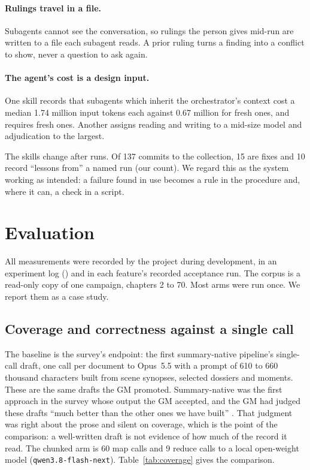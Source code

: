 \documentclass[11pt]{article}
\newcommand{\code}[1]{\texttt{#1}}
\begin{document}
\paragraph{Rulings travel in a file.} Subagents cannot see the conversation, so rulings
the person gives mid-run are written to a file each subagent reads. A prior ruling turns
a finding into a conflict to show, never a question to ask again.

\paragraph{The agent's cost is a design input.} One skill records that subagents which
inherit the orchestrator's context cost a median 1.74 million input tokens each against
0.67 million for fresh ones, and requires fresh ones. Another assigns reading and
writing to a mid-size model and adjudication to the largest.

The skills change after runs. Of 137 commits to the collection, 15 are fixes and 10
record ``lessons from'' a named run (our count). We regard this as the system working as
intended: a failure found in use becomes a rule in the procedure and, where it can, a
check in a script.

\section{Evaluation}
\label{sec:eval}

All measurements were recorded by the project during development, in an experiment log
() and in each feature's
recorded acceptance run. The corpus is a read-only copy of one campaign, chapters 2 to
70. Most arms were run once. We report them as a case study.

\subsection{Coverage and correctness against a single call}

The baseline is the survey's endpoint: the first summary-native pipeline's single-call
draft, one call per document to Opus~5.5 with a prompt of 610 to 660 thousand
characters built from scene synopses, selected dossiers and moments.
These are the same drafts the GM promoted. Summary-native was the first approach in the
survey whose output the GM accepted, and the GM had judged these drafts ``much better than the other ones we have built''
\citep{roussos2026survey}. That judgment was right about the prose and silent on
coverage, which is the point of the comparison: a well-written draft is not evidence
of how much of the record it read. The chunked arm is
60 map calls and 9 reduce calls to a local open-weight model (\code{qwen3.8-flash-next}).
Table~\ref{tab:coverage} gives the comparison.
\end{document}
